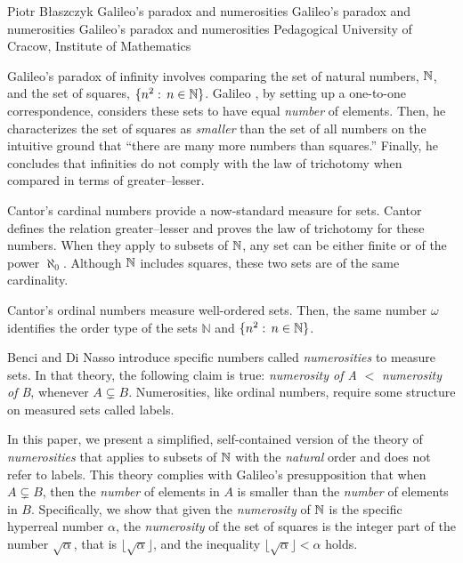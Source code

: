 \begin{artengenv}{Piotr Błaszczyk}
	{Galileo's paradox and numerosities}
	{Galileo's paradox and numerosities}
	{Galileo's paradox and numerosities}
	{Pedagogical University of Cracow, Institute of Mathematics}
	{Galileo's paradox of infinity involves comparing the set of natural numbers, ${\mathbb{N}}$, and the set of squares, $\{n^2:\, n\in{\mathbb{N}}\}$. Galileo \parencite*{ref_GG38},  by setting up a one-to-one correspondence, considers these sets  to have equal \textit{number} of elements. Then, he characterizes the set of squares as \textit{smaller} than the set of all numbers on the intuitive ground that ``there are many more numbers than squares.''  
	Finally, he concludes that infinities do not comply with the law of trichotomy when compared in terms of greater--lesser.
	
	Cantor's cardinal numbers provide a now-standard measure for sets. Cantor \parencites*{ref_C97}[Engl. transl.][]{ref_C15}  defines the relation greater--lesser and proves the law of trichotomy for these numbers. 
	When they apply to subsets of ${\mathbb{N}}$,   any set can be either finite or of the power $\aleph_0$. Although  ${\mathbb{N}}$  includes squares, these two sets are of the same cardinality.
	
	Cantor's ordinal numbers {measure}  well-ordered sets. Then, the same number $\omega$  identifies the order type of the sets  $\mathbb N$ and \mbox{$\{n^2:\, n\in{\mathbb{N}}\}$}.
	
	Benci and Di Nasso \parencite*{ref_BN19} introduce specific numbers called \textit{numerosities}  to  measure sets. In that theory,  the following claim is true: \textit{numerosity of A} $<$ \textit{numerosity of B}, whenever $A\subsetneq B$. Numerosities, like  ordinal numbers,  require some structure on measured sets called labels.
	
	In this paper, we present a simplified, self-contained version of the theory of \textit{numerosities} that applies to subsets of ${\mathbb{N}}$ with the \textit{natural} order and does not refer to labels. This theory complies with Galileo's presupposition that when $A\subsetneq B$, then
	the \textit{number} of  elements in $A$ is  smaller than the \textit{number}  of  elements in $B$. Specifically, we show that given the \textit{numerosity} of ${\mathbb{N}}$ is the specific hyperreal number $\alpha$, the \textit{numerosity} of the set of squares is the integer part of the number $\sqrt{\alpha}$, that is $\big\lfloor\sqrt{\alpha}\big\rfloor$, and  the inequality  $\big\lfloor\sqrt\alpha\big\rfloor<\alpha$ holds.
	
}
\end{artengenv}
